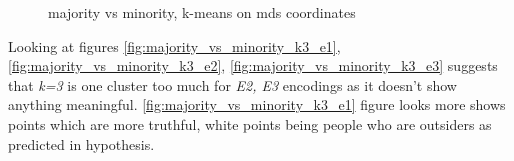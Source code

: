 \documentclass[a4paper,12pt]{article}
\begin{document}
	\begin{figure}[!tbp]
		\centering
		\hfill
		\hfill
		\caption{majority vs minority, \gls{k-means} on \acrshort{mds} coordinates}
	\end{figure}
	
	\clearpage

	Looking at figures \ref{fig:majority_vs_minority_k3_e1},\ref{fig:majority_vs_minority_k3_e2}, \ref{fig:majority_vs_minority_k3_e3} suggests that \textit{k=3} is one cluster too much for \textit{E2, E3} encodings as it doesn't show anything meaningful. \ref{fig:majority_vs_minority_k3_e1} figure looks more shows points which are more truthful, white points being people who are outsiders as predicted in hypothesis. 
\end{document}
